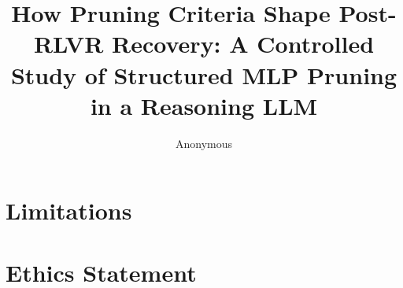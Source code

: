 \documentclass[11pt]{article}
\title{How Pruning Criteria Shape Post-RLVR Recovery: A Controlled Study of Structured MLP Pruning in a Reasoning LLM}
\author{Anonymous}
\begin{document}
\maketitle

\begin{abstract}

\end{abstract}







\section*{Limitations}


\section*{Ethics Statement}




\appendix

\end{document}
